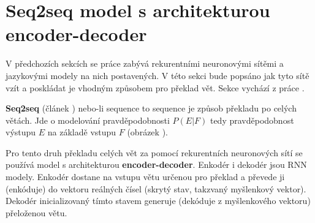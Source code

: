 

\section{Seq2seq model s architekturou encoder-decoder}
V předchozích sekcích se práce zabývá rekurentními neuronovými sítěmi a jazykovými modely na nich postavených. V této sekci bude popsáno jak tyto sítě vzít a poskládat je vhodným způsobem pro překlad vět. Sekce vychází z práce \cite{nmtTutorial}.

\textbf{Seq2seq} (článek \cite{seq2seq}) nebo-li sequence to sequence je způsob překladu po celých větách. Jde o modelování pravděpodobnosti $P(E|F)$ tedy pravděpodobnost výstupu $E$ na základě vstupu $F$ (obrázek ).

\begin{figure}
    \begin{center}
    \end{center}
	\caption{}
	\label{img:seq2seqProb}
\end{figure}

Pro tento druh překladu celých vět za pomocí rekurentních neuronových sítí se používá model s architekturou \textbf{encoder-decoder}. Enkodér i dekodér jsou RNN modely. Enkodér dostane na vstupu větu určenou pro překlad a převede ji (enkóduje) do vektoru reálných čísel (skrytý stav, takzvaný myšlenkový vektor). Dekodér inicializovaný tímto stavem generuje (dekóduje z myšlenkového vektoru) přeloženou větu. 


